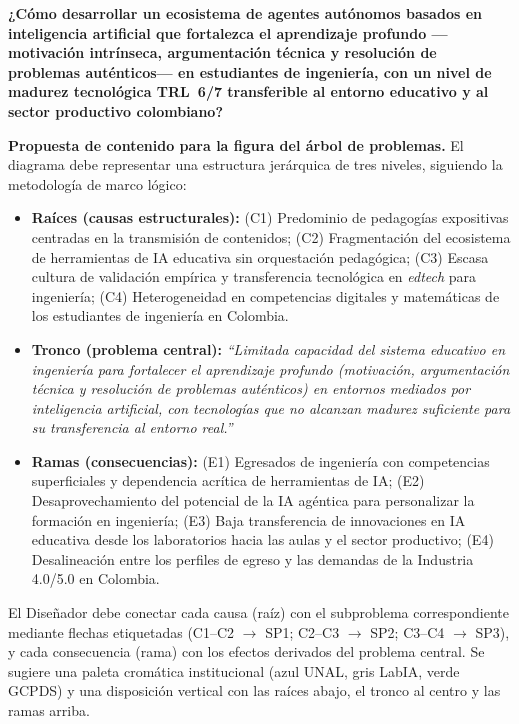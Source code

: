 \bigskip

\noindent\textbf{¿Cómo desarrollar un ecosistema de agentes autónomos basados en
inteligencia artificial que fortalezca el aprendizaje profundo —motivación intrínseca,
argumentación técnica y resolución de problemas auténticos— en estudiantes de ingeniería,
con un nivel de madurez tecnológica TRL~6/7 transferible al entorno educativo y al sector
productivo colombiano?}

\bigskip


\medskip

\noindent\textbf{Propuesta de contenido para la figura del árbol de problemas.}
El diagrama debe representar una estructura jerárquica de tres niveles, siguiendo la
metodología de marco lógico:

\begin{itemize}
    \item \textbf{Raíces (causas estructurales):} (C1) Predominio de pedagogías
    expositivas centradas en la transmisión de contenidos; (C2) Fragmentación del
    ecosistema de herramientas de IA educativa sin orquestación pedagógica; (C3) Escasa
    cultura de validación empírica y transferencia tecnológica en \emph{edtech} para
    ingeniería; (C4) Heterogeneidad en competencias digitales y matemáticas de los
    estudiantes de ingeniería en Colombia.

    \item \textbf{Tronco (problema central):} \emph{``Limitada capacidad del sistema
    educativo en ingeniería para fortalecer el aprendizaje profundo (motivación,
    argumentación técnica y resolución de problemas auténticos) en entornos mediados por
    inteligencia artificial, con tecnologías que no alcanzan madurez suficiente para su
    transferencia al entorno real.''}

    \item \textbf{Ramas (consecuencias):} (E1) Egresados de ingeniería con competencias
    superficiales y dependencia acrítica de herramientas de IA; (E2) Desaprovechamiento
    del potencial de la IA agéntica para personalizar la formación en ingeniería; (E3)
    Baja transferencia de innovaciones en IA educativa desde los laboratorios hacia las
    aulas y el sector productivo; (E4) Desalineación entre los perfiles de egreso y las
    demandas de la Industria 4.0/5.0 en Colombia.
\end{itemize}

El Diseñador debe conectar cada causa (raíz) con el subproblema correspondiente mediante
flechas etiquetadas (C1--C2 $\rightarrow$ SP1; C2--C3 $\rightarrow$ SP2; C3--C4
$\rightarrow$ SP3), y cada consecuencia (rama) con los efectos derivados del problema
central. Se sugiere una paleta cromática institucional (azul UNAL, gris LabIA, verde
GCPDS) y una disposición vertical con las raíces abajo, el tronco al centro y las ramas
arriba.
